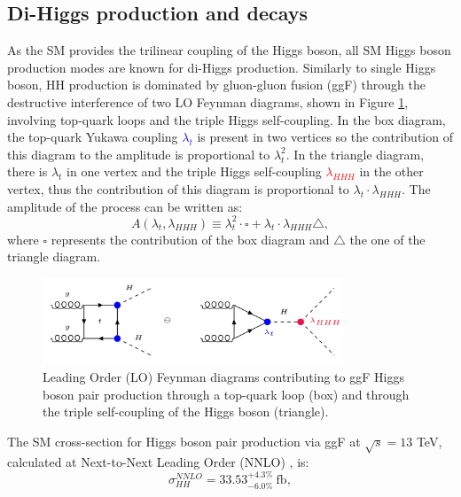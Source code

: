 \subsection{Di-Higgs production and decays} 
\label{chap1:HH:HPD}
As the SM provides the trilinear coupling of the Higgs boson, all SM Higgs boson production modes are known for di-Higgs production. Similarly to single Higgs boson, HH production is dominated by gluon-gluon fusion (ggF) through the destructive interference of two LO Feynman diagrams, shown in Figure \ref{fig:chap1:HH:HPD:FY}, involving top-quark loops and the triple Higgs self-coupling. In the box diagram, the top-quark Yukawa coupling \textcolor{blue}{$\lambda_t$} is present in two vertices so the contribution of this diagram to the amplitude is proportional to $\lambda_t^2$. In the triangle diagram, there is $\lambda_t$ in one vertex and the triple Higgs self-coupling \textcolor{red}{$\lambda_{HHH}$} in the other vertex, thus the contribution of this diagram is proportional to $\lambda_t\cdot\lambda_{HHH}$. The amplitude of the process can be written as:
\begin{equation}
    A(\lambda_t, \lambda_{HHH}) \equiv \lambda_t^2\cdot\square + \lambda_t\cdot\lambda_{HHH}\bigtriangleup,
\end{equation}
where $\square$ represents the contribution of the box diagram and $\bigtriangleup$ the one of the triangle diagram. 
\begin{figure}[htbp]
    \centering
    \includegraphics[width=0.8\textwidth]{Ch1/Img/HH_feyn.png}
    \begin{tcolorbox}[colback=black!5!white,colframe=white!75!black]
    \caption{Leading Order (LO) Feynman diagrams contributing to ggF Higgs boson pair production through a top-quark loop (box) and through the triple self-coupling of the Higgs boson (triangle).}
    \label{fig:chap1:HH:HPD:FY}
    \end{tcolorbox}
\end{figure}
The SM cross-section for Higgs boson pair production via ggF at $\sqrt{s}=13$ TeV, calculated at Next-to-Next Leading Order (NNLO) \cite{HHXSec1, HHXSec2}, is:
\begin{equation}
    \sigma_{HH}^{NNLO} = 33.53_{-6.0\%}^{+4.3\%} \ \text{fb},
    \label{eq:chap1:HH:XSEC:NNL0}
\end{equation}
